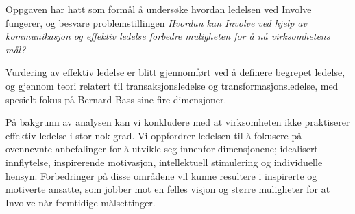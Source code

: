 Oppgaven har hatt som formål å undersøke hvordan ledelsen ved Involve fungerer, og besvare problemstillingen \textit{Hvordan kan Involve ved hjelp av kommunikasjon og effektiv ledelse forbedre muligheten for å nå virksomhetens mål?} 

\indent \newline
Vurdering av effektiv ledelse er blitt gjennomført ved å definere begrepet ledelse, og gjennom teori relatert til transaksjonsledelse og transformasjonsledelse, med spesielt fokus på Bernard Bass sine fire dimensjoner. 

\indent \newline
På bakgrunn av analysen kan vi konkludere med at virksomheten ikke praktiserer effektiv ledelse i stor nok grad. Vi oppfordrer ledelsen til å fokusere på ovennevnte anbefalinger for å utvikle seg innenfor dimensjonene; idealisert innflytelse, inspirerende motivasjon, intellektuell stimulering og individuelle hensyn. Forbedringer på disse områdene vil kunne resultere i inspirerte og motiverte ansatte, som jobber mot en felles visjon og større muligheter for at Involve når fremtidige målsettinger.